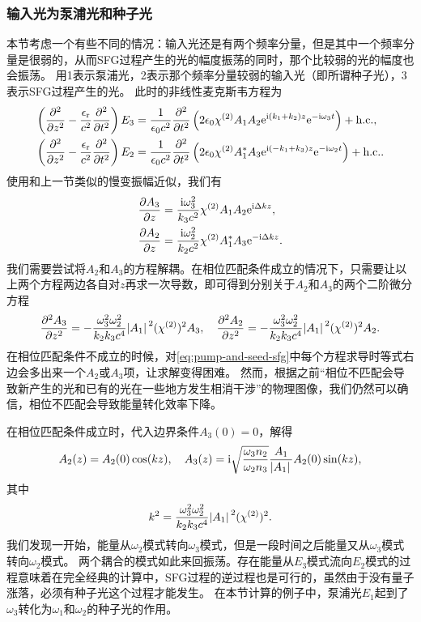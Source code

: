 \subsubsection{输入光为泵浦光和种子光}

本节考虑一个有些不同的情况：输入光还是有两个频率分量，但是其中一个频率分量是很弱的，从而SFG过程产生的光的幅度振荡的同时，那个比较弱的光的幅度也会振荡。
用1表示泵浦光，2表示那个频率分量较弱的输入光（即所谓种子光），3表示SFG过程产生的光。
此时的非线性麦克斯韦方程为
\[
    \begin{aligned}
        \left( \pdv[2]{z} - \frac{\epsilon_\text{r}}{c^2} \pdv[2]{t} \right) E_3 &= \frac{1}{\epsilon_0 c^2} \pdv[2]{t} \left( 2 \epsilon_0  \chi^{(2)} A_1 A_2 \mathrm{e}^{\mathrm{i} (k_1 + k_2) z} \mathrm{e}^{-\mathrm{i} \omega_3 t} \right) + \text{h.c.}, \\
        \left( \pdv[2]{z} - \frac{\epsilon_\text{r}}{c^2} \pdv[2]{t} \right) E_2 &= \frac{1}{\epsilon_0 c^2} \pdv[2]{t} \left( 2 \epsilon_0  \chi^{(2)} A_1^* A_3 \mathrm{e}^{\mathrm{i} (- k_1 + k_3) z} \mathrm{e}^{-\mathrm{i} \omega_2 t} \right) + \text{h.c.}.
    \end{aligned}
\]
使用和上一节类似的慢变振幅近似，我们有
\begin{equation}
    \begin{aligned}
        \pdv{A_3}{z} &= \frac{\mathrm{i} \omega_3^2}{k_3 c^2} \chi^{(2)} A_1 A_2 \mathrm{e}^{\mathrm{i} \Delta k z}, \\
        \pdv{A_2}{z} &= \frac{\mathrm{i} \omega_2^2}{k_2 c^2} \chi^{(2)} A_1^* A_3 \mathrm{e}^{- \mathrm{i} \Delta k z}.
    \end{aligned}
    \label{eq:pump-and-seed-sfg}
\end{equation}
我们需要尝试将$A_2$和$A_3$的方程解耦。在相位匹配条件成立的情况下，只需要让以上两个方程两边各自对$z$再求一次导数，即可得到分别关于$A_2$和$A_3$的两个二阶微分方程
\[
    \pdv[2]{A_3}{z} = - \frac{\omega_3^2 \omega_2^2}{k_2 k_3 c^4} \abs*{A_1}^2 (\chi^{(2)})^2 A_3, \quad \pdv[2]{A_2}{z} = - \frac{\omega_3^2 \omega_2^2}{k_2 k_3 c^4} \abs*{A_1}^2 (\chi^{(2)})^2 A_2.
\]
在相位匹配条件不成立的时候，对\eqref{eq:pump-and-seed-sfg}中每个方程求导时等式右边会多出来一个$A_2$或$A_3$项，让求解变得困难。
然而，根据之前“相位不匹配会导致新产生的光和已有的光在一些地方发生相消干涉”的物理图像，我们仍然可以确信，相位不匹配会导致能量转化效率下降。

在相位匹配条件成立时，代入边界条件$A_3(0) = 0$，解得
\begin{equation}
    A_2(z) = A_2(0) \cos(k z), \quad A_3(z) = \mathrm{i} \sqrt{\frac{\omega_3 n_2}{\omega_2 n_3}} \frac{A_1}{\abs*{A_1}} A_2(0) \sin(k z),
\end{equation}
其中
\begin{equation}
    k^2 = \frac{\omega_3^2 \omega_2^2}{k_2 k_3 c^4} \abs*{A_1}^2 (\chi^{(2)})^2. 
\end{equation}
我们发现一开始，能量从$\omega_2$模式转向$\omega_3$模式，但是一段时间之后能量又从$\omega_3$模式转向$\omega_2$模式。
两个耦合的模式如此来回振荡。存在能量从$E_3$模式流向$E_2$模式的过程意味着在完全经典的计算中，SFG过程的逆过程也是可行的，虽然由于没有量子涨落，必须有种子光这个过程才能发生。
在本节计算的例子中，泵浦光$E_1$起到了$\omega_3$转化为$\omega_1$和$\omega_2$的种子光的作用。

